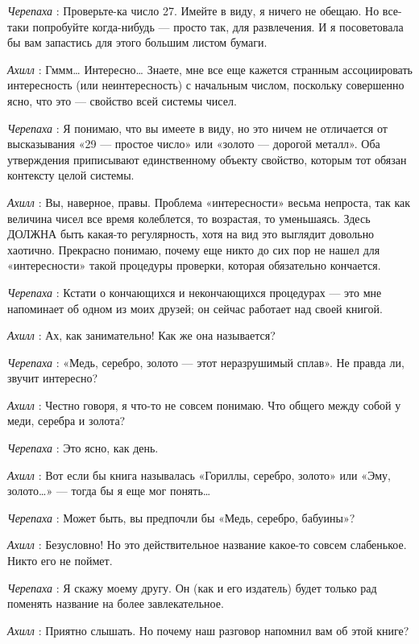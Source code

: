 \emph{Черепаха} : Проверьте-ка число 27. Имейте в виду, я ничего не обещаю. Но все-таки попробуйте когда-нибудь --- просто так, для развлечения. И я посоветовала бы вам запастись для этого большим листом бумаги.

\emph{Ахилл} : Гммм\ldots{} Интересно\ldots{} Знаете, мне все еще кажется странным ассоциировать интересность (или неинтересность) с начальным числом, поскольку совершенно ясно, что это --- свойство всей системы чисел.

\emph{Черепаха} : Я понимаю, что вы имеете в виду, но это ничем не отличается от высказывания «29 --- простое число» или «золото --- дорогой металл». Оба утверждения приписывают единственному объекту свойство, которым тот обязан контексту целой системы.

\emph{Ахилл} : Вы, наверное, правы. Проблема «интересности» весьма непроста, так как величина чисел все время колеблется, то возрастая, то уменьшаясь. Здесь ДОЛЖНА быть какая-то регулярность, хотя на вид это выглядит довольно хаотично. Прекрасно понимаю, почему еще никто до сих пор не нашел для «интересности» такой процедуры проверки, которая обязательно кончается.

\emph{Черепаха} : Кстати о кончающихся и некончающихся процедурах --- это мне напоминает об одном из моих друзей; он сейчас работает над своей книгой.

\emph{Ахилл} : Ах, как занимательно! Как же она называется?

\emph{Черепаха} : «Медь, серебро, золото --- этот неразрушимый сплав». Не правда ли, звучит интересно?

\emph{Ахилл} : Честно говоря, я что-то не совсем понимаю. Что общего между собой у меди, серебра и золота?

\emph{Черепаха} : Это ясно, как день.

\emph{Ахилл} : Вот если бы книга называлась «Гориллы, серебро, золото» или «Эму, золото\ldots» --- тогда бы я еще мог понять\ldots{}

\emph{Черепаха} : Может быть, вы предпочли бы «Медь, серебро, бабуины»?

\emph{Ахилл} : Безусловно! Но это действительное название какое-то совсем слабенькое. Никто его не поймет.

\emph{Черепаха} : Я скажу моему другу. Он (как и его издатель) будет только рад поменять название на более завлекательное.

\emph{Ахилл} : Приятно слышать. Но почему наш разговор напомнил вам об этой книге?

